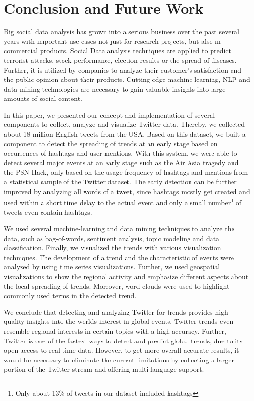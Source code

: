 
\chapter{Conclusion and Future Work}
\label{cha:conclusion-future-work}
Big social data analysis has grown into a serious business over the past several years with important use cases not just for research projects, but also in commercial products. Social Data analysis techniques are applied to predict terrorist attacks, stock performance, election results or the spread of diseases. Further, it is utilized by companies to analyze their customer’s satisfaction and the public opinion about their products. Cutting edge machine-learning, NLP and data mining technologies are necessary to gain valuable insights into large amounts of social content.

In this paper, we presented our concept and implementation of several components to collect, analyze and visualize Twitter data. Thereby, we collected about 18 million English tweets from the USA. Based on this dataset, we built a component to detect the spreading of trends at an early stage based on occurrences of hashtags and user mentions. With this system, we were able to detect several major events at an early stage such as the Air Asia tragedy and the PSN Hack, only based on the usage frequency of hashtags and mentions from a statistical sample of the Twitter dataset. The early detection can be further improved by analyzing all words of a tweet, since hashtags mostly get created and used within a short time delay to the actual event and only a small number\footnote{Only about 13\% of tweets in our dataset included hashtags} of tweets even contain hashtags.

We used several machine-learning and data mining techniques to analyze the data, such as bag-of-words, sentiment analysis, topic modeling and data classification. Finally, we visualized the trends with various visualization techniques. The development of a trend and the characteristic of events were analyzed by using time series visualizations. Further, we used geospatial visualizations to show the regional activity and emphasize different aspects about the local spreading of trends. Moreover, word clouds were used to highlight commonly used terms in the detected trend.

We conclude that detecting and analyzing Twitter for trends provides high-quality insights into the worlds interest in global events. Twitter trends even resemble regional interests in certain topics with a high accuracy. Further, Twitter is one of the fastest ways to detect and predict global trends, due to its open access to real-time data. However, to get more overall accurate results, it would be necessary to eliminate the current limitations by collecting a larger portion of the Twitter stream and offering multi-language support.

